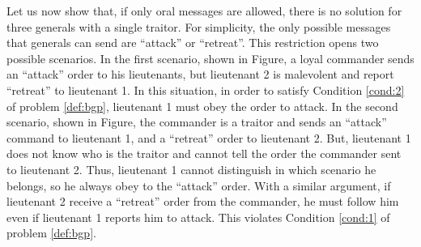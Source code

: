 \bigskip
\noindent
Let us now show that, if only oral messages are allowed, there is no solution for three generals with a single traitor. For simplicity, the only possible messages that generals can send are \enquote{attack} or \enquote{retreat}. This restriction opens two possible scenarios. In the first scenario, shown in Figure, a loyal commander sends an \enquote{attack} order to his lieutenants, but lieutenant 2 is malevolent and report \enquote{retreat} to lieutenant 1. In this situation, in order to satisfy Condition \ref{cond:2} of problem \ref{def:bgp}, lieutenant 1 must obey the order to attack. In the second scenario, shown in Figure, the commander is a traitor and sends an \enquote{attack} command to lieutenant 1, and a \enquote{retreat} order to lieutenant 2. But, lieutenant 1 does not know who is the traitor and cannot tell the order the commander sent to lieutenant 2. Thus, lieutenant 1 cannot distinguish in which scenario he belongs, so he always obey to the \enquote{attack} order. With a similar argument, if lieutenant 2 receive a \enquote{retreat} order from the commander, he must follow him even if lieutenant 1 reports him to attack. This violates Condition \ref{cond:1} of problem \ref{def:bgp}.

